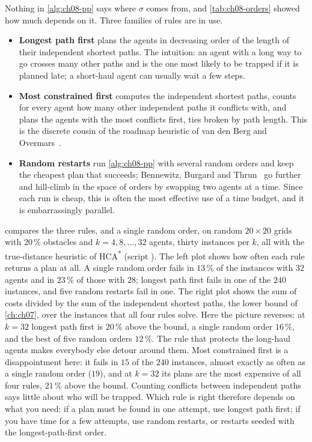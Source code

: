 Nothing in \cref{alg:ch08-pp} says where $\sigma$ comes from, and
\cref{tab:ch08-orders} showed how much depends on it. Three families of rules are in
use.
\begin{itemize}
  \item \textbf{Longest path first} plans the
        agents in decreasing order of the length of their independent shortest paths.
        The intuition: an agent with a long way to go crosses many other paths and is
        the one most likely to be trapped if it is planned late; a short-haul agent can
        usually wait a few steps.
  \item \textbf{Most constrained first}
        computes the independent shortest paths, counts for every agent how many other
        independent paths it conflicts with, and plans the agents with the most
        conflicts first, ties broken by path length. This is the discrete cousin of
        the roadmap heuristic of van den Berg and
        Overmars~\cite{vandenberg2005prioritized}.
  \item \textbf{Random restarts} run
        \cref{alg:ch08-pp} with several random orders and keep the cheapest plan that
        succeeds; Bennewitz, Burgard and Thrun~\cite{bennewitz2002finding} go further
        and hill-climb in the space of orders by swapping two agents at a time. Since
        each run is cheap, this is often the most effective use of a time budget, and
        it is embarrassingly parallel.
\end{itemize}

 compares the three rules, and a single random order, on random
$20 \times 20$ grids with $20\,\%$ obstacles and $k = 4, 8, \dots, 32$ agents, thirty
instances per $k$, all with the true-distance heuristic of HCA\textsuperscript{*}
(script ). The left plot shows how often each
rule returns a plan at all. A single random order fails in $13\,\%$ of the instances
with $32$ agents and in $23\,\%$ of those with $28$; longest path first fails in one of
the $240$ instances, and five random restarts fail in one. The right plot shows the
sum of costs divided by the sum of the independent shortest paths, the lower bound of
\cref{ch:ch07}, over the instances that all four rules solve. Here the picture reverses:
at $k = 32$ longest path first is $20\,\%$ above the bound, a single random order
$16\,\%$, and the best of five random orders $12\,\%$. The rule that protects the
long-haul agents makes everybody else detour around them. Most constrained first is a
disappointment here: it fails in $15$ of the $240$ instances, almost exactly as often
as a single random order ($19$), and at $k = 32$ its plans are the most expensive of
all four rules, $21\,\%$ above the bound. Counting conflicts between independent paths
says little about who will be trapped. Which rule is right therefore
depends on what you need: if a plan must be found in one attempt, use longest path
first; if you have time for a few attempts, use random restarts, or restarts seeded
with the longest-path-first order.

